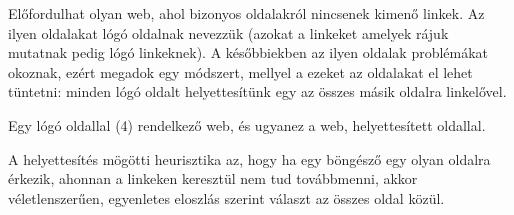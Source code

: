 \documentclass[12pt,a4paper]{article}
\begin{document}
Előfordulhat olyan web, ahol bizonyos oldalakról nincsenek kimenő linkek. Az ilyen oldalakat lógó oldalnak nevezzük (azokat a linkeket amelyek rájuk mutatnak pedig lógó linkeknek). A későbbiekben az ilyen oldalak problémákat okoznak, ezért megadok egy módszert, mellyel a ezeket az oldalakat el lehet tüntetni: minden lógó oldalt helyettesítünk egy az összes másik oldalra linkelővel. 

\bigskip

\begin{minipage}{0.4\textwidth}
	\begin{center}
	\end{center}
\end{minipage}
\begin{minipage}{0.5\textwidth}
	\begin{center}
	\end{center}
\end{minipage}

\bigskip
\centerline{Egy lógó oldallal (4) rendelkező web, és ugyanez a web, helyettesített oldallal.}

\vspace{0.5 cm}

A helyettesítés mögötti heurisztika az, hogy ha egy böngésző egy olyan oldalra érkezik, ahonnan a linkeken keresztül nem tud továbbmenni, akkor véletlenszerűen, egyenletes eloszlás szerint választ az összes oldal közül.
\end{document}
